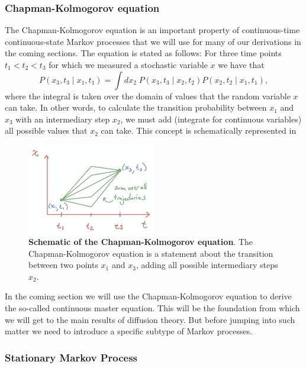 \subsubsection{Chapman-Kolmogorov equation} \label{sec_chapman_kolmogorov}

The Chapman-Kolmogorov equation is an important property of continuous-time
continuous-state Markov processes that we will use for many of our derivations
in the coming sections. The equation is stated as follows: For three time points
$t_1 < t_2 < t_3$ for which we measured a stochastic variable $x$ we have that
\begin{equation}
  P(x_3, t_3 \mid x_1, t_1) = \int dx_2\; P(x_3, t_3 \mid x_2, t_2)
                                          P(x_2, t_2 \mid x_1, t_1),
\end{equation}
where the integral is taken over the domain of values that the random variable
$x$ can take. In other words, to calculate the transition probability between
$x_1$ and $x_3$ with an intermediary step $x_2$, we must add (integrate for
continuous variables) all possible values that $x_2$ can take. This concept is
schematically represented in 

\begin{figure}[h!]
	\centering \includegraphics[width=0.5\textwidth]
  {../fig/classic_diffusion/03_02_01_chapman_kolmogorov.png}
	\caption{\textbf{Schematic of the Chapman-Kolmogorov equation}. The
  Chapman-Kolmogorov equation is a statement about the transition between two
  points $x_1$ and $x_3$, adding all possible intermediary steps $x_2$.}
  \label{fig_03_02_01}
\end{figure}

In the coming section we will use the Chapman-Kolmogorov equation to derive the
so-called continuous master equation. This will be the foundation from which we
will get to the main results of diffusion theory. But before jumping into such
matter we need to introduce a specific subtype of Markov processes.

\subsubsection{Stationary Markov Process}\label{sec_stationary_process}

